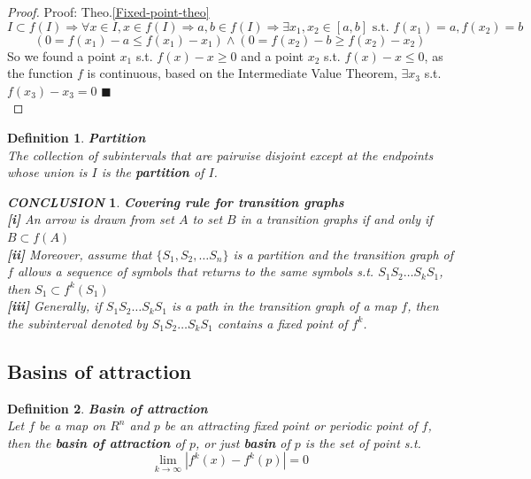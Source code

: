 \documentclass[12pt]{article}
\theoremstyle{plain}
\newtheorem{definition}{\textbf{Definition}}[section]
\newtheorem{proof}{\textit{PROOF}}[section]
\newtheorem{conclusion}{\textit{\textbf{CONCLUSION}}}[section]
\begin{document}
{\color{blue}
\begin{proof} Proof: Theo.\ref{Fixed-point-theo}
$$
I \subset f(I) \Rightarrow \forall x \in I, x \in f(I) \Rightarrow a, b \in f(I) \Rightarrow \exists x_1, x_2 \in [a, b] \text{ s.t. } f(x_1) = a, f(x_2) = b
$$
$$
\left(0 = f(x_1) - a \leq f(x_1) - x_1\right) \land \left(0 = f(x_2) - b \geq f(x_2) - x_2 \right)
$$
So we found a point $x_1$ s.t. $f(x) - x \geq 0$ and a point $x_2$ s.t. $f(x) - x \leq 0$, as the function $f$ is continuous, based on the Intermediate Value Theorem, $\exists x_3$ s.t. $f(x_3) - x_3 = 0$ $\blacksquare$\\[1ex] 
\end{proof}
}


\begin{definition} \textbf{Partition}
\\\noindent The collection of subintervals that are pairwise disjoint except at the endpoints whose union is $I$ is the \textbf{partition} of $I$.
\end{definition} 

\begin{conclusion}\label{covering-rule-for-tg}\textbf{Covering rule for transition graphs}
\\\noindent \textbf{[i]} An arrow is drawn from set $A$ to set $B$ in a transition graphs if and only if $B \subset f(A)$
\\\noindent \textbf{[ii]} Moreover, assume that $\{S_1, S_2, \ldots S_n\}$ is a partition and the transition graph of $f$ allows a sequence of symbols that returns to the same symbols s.t. $S_1S_2\ldots S_kS_1$, then $S_1 \subset f^k(S_1)$
\\\noindent \textbf{[iii]} Generally, if $S_1S_2\ldots S_{k}S_1$ is a path in the transition graph of a map $f$, then the subinterval denoted by $S_1S_2\ldots S_{k}S_1$ contains a fixed point of $f^k$.
\end{conclusion}









\newpage
\subsection{Basins of attraction}
\begin{definition}\label{basin-of-attraction}\textbf{Basin of attraction}
\\\noindent Let $f$ be a map on $R^n$ and $p$ be an attracting fixed point or periodic point of $f$, then the \textbf{basin of attraction} of $p$, or just \textbf{basin} of $p$ is the set of point s.t. 
$$
\lim_{k \rightarrow \infty}\left|f^k(x) - f^k(p)\right| = 0
$$

\end{definition}
\end{document}
